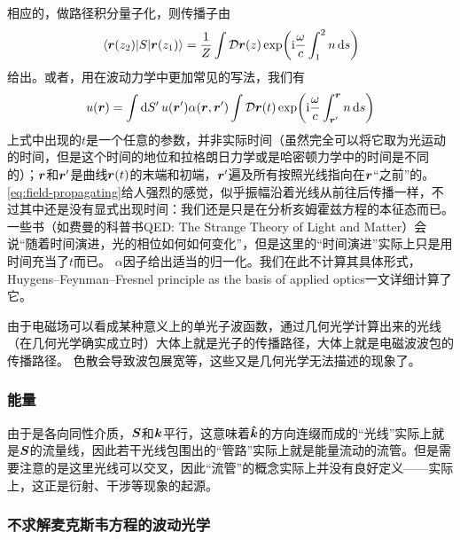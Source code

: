\documentclass[UTF8, a4paper]{ctexart}
\newcommand*{\ii}{\mathrm{i}}
\begin{document}
相应的，做路径积分量子化，则传播子由
\begin{equation}
    \mel{\vb*{r}(z_2)}{S}{\vb*{r}(z_1)} = \frac{1}{Z} \int \mathcal{D} {\vb*{r}(z)} \exp(\ii \frac{\omega}{c} \int_1^2 n \dd{s})
\end{equation}
给出。或者，用在波动力学中更加常见的写法，我们有
\begin{equation}
    u(\vb*{r}) = \int \dd{S'} u(\vb*{r}') \alpha(\vb*{r}, \vb*{r}') \int \mathcal{D} {\vb*{r}(t)} \exp(\ii \frac{\omega}{c} \int_{\vb*{r}'}^{\vb*{r}} n \dd{s})
    \label{eq:field-propagating}
\end{equation}
上式中出现的$t$是一个任意的参数，并非实际时间（虽然完全可以将它取为光运动的时间，但是这个时间的地位和拉格朗日力学或是哈密顿力学中的时间是不同的）；$\vb*{r}$和$\vb*{r}'$是曲线$\vb*{r}(t)$的末端和初端，$\vb*{r}'$遍及所有按照光线指向在$\vb*{r}$“之前”的。
\eqref{eq:field-propagating}给人强烈的感觉，似乎振幅沿着光线从前往后传播一样，不过其中还是没有显式出现时间：我们还是只是在分析亥姆霍兹方程的本征态而已。
一些书（如费曼的科普书QED: The Strange Theory of Light and Matter）会说“随着时间演进，光的相位如何如何变化”，但是这里的“时间演进”实际上只是用时间充当了$t$而已。
$\alpha$因子给出适当的归一化。我们在此不计算其具体形式，Huygens–Feynman–Fresnel principle as the basis of applied optics一文详细计算了它。

由于电磁场可以看成某种意义上的单光子波函数，通过几何光学计算出来的光线（在几何光学确实成立时）大体上就是光子的传播路径，大体上就是电磁波波包的传播路径。
色散会导致波包展宽等，这些又是几何光学无法描述的现象了。

\subsubsection{能量}

由于是各向同性介质，$\vb*{S}$和$\vb*{k}$平行，这意味着$\vu*{k}$的方向连缀而成的“光线”实际上就是$\vb*{S}$的流量线，因此若干光线包围出的“管路”实际上就是能量流动的流管。但是需要注意的是这里光线可以交叉，因此“流管”的概念实际上并没有良好定义——实际上，这正是衍射、干涉等现象的起源。

\subsubsection{不求解麦克斯韦方程的波动光学}
\end{document}
